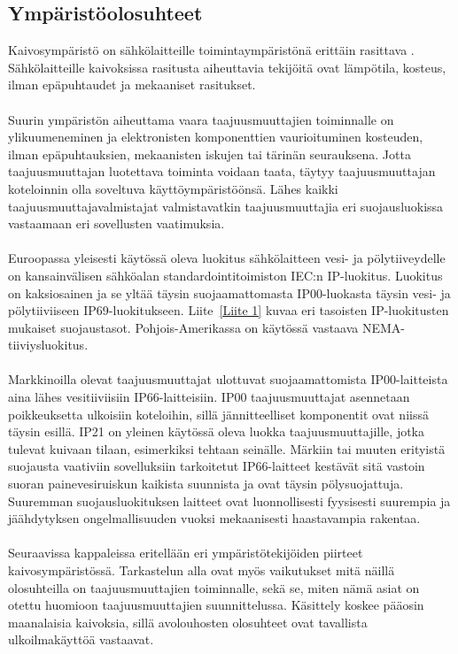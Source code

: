 \documentclass[finnish,12pt,a4paper,pdftex,elec,utf8]{aaltothesis}
\begin{document}
\subsection{Ympäristöolosuhteet}
Kaivosympäristö on sähkölaitteille toimintaympäristönä erittäin rasittava \cite[s. 251]{Hakapää}. Sähkölaitteille kaivoksissa rasitusta aiheuttavia tekijöitä ovat lämpötila, kosteus, ilman epäpuhtaudet ja mekaaniset rasitukset.
\\\\
Suurin ympäristön aiheuttama vaara taajuusmuuttajien toiminnalle on ylikuumeneminen ja elektronisten komponenttien vaurioituminen kosteuden, ilman  epäpuhtauksien, mekaanisten iskujen tai tärinän seurauksena. Jotta taajuusmuuttajan luotettava toiminta voidaan taata, täytyy taajuusmuuttajan koteloinnin olla soveltuva käyttöympäristöönsä. Lähes kaikki taajuusmuuttajavalmistajat valmistavatkin taajuusmuuttajia eri suojausluokissa vastaamaan eri sovellusten vaatimuksia.
\\\\
Euroopassa yleisesti käytössä oleva luokitus sähkölaitteen vesi- ja pölytiiveydelle on kansainvälisen sähköalan standardointitoimiston IEC:n IP-luokitus. Luokitus on kaksiosainen ja se yltää täysin suojaamattomasta IP00-luokasta täysin vesi- ja pölytiiviiseen IP69-luokitukseen. Liite~\ref{Liite 1} kuvaa eri tasoisten IP-luokitusten mukaiset suojaustasot. Pohjois-Amerikassa on käytössä vastaava NEMA-tiiviysluokitus.
\\\\
Markkinoilla olevat taajuusmuuttajat ulottuvat suojaamattomista IP00-laitteista aina lähes vesitiiviisiin IP66-laitteisiin. IP00 taajuusmuuttajat asennetaan poikkeuksetta ulkoisiin koteloihin, sillä jännitteelliset komponentit ovat niissä täysin esillä. IP21 on yleinen käytössä oleva luokka taajuusmuuttajille, jotka tulevat kuivaan tilaan, esimerkiksi tehtaan seinälle. Märkiin tai muuten erityistä suojausta vaativiin sovelluksiin tarkoitetut IP66-laitteet kestävät sitä vastoin suoran painevesiruiskun kaikista suunnista ja ovat täysin pölysuojattuja. Suuremman suojausluokituksen laitteet ovat luonnollisesti fyysisesti suurempia ja jäähdytyksen ongelmallisuuden vuoksi mekaanisesti haastavampia rakentaa.
\\\\
Seuraavissa kappaleissa eritellään eri ympäristötekijöiden piirteet kaivosympäristössä. Tarkastelun alla ovat myös vaikutukset mitä näillä olosuhteilla on taajuusmuuttajien toiminnalle, sekä se, miten nämä asiat on otettu huomioon taajuusmuuttajien suunnittelussa. Käsittely koskee pääosin maanalaisia kaivoksia, sillä avolouhosten olosuhteet ovat tavallista ulkoilmakäyttöä vastaavat.
\end{document}
